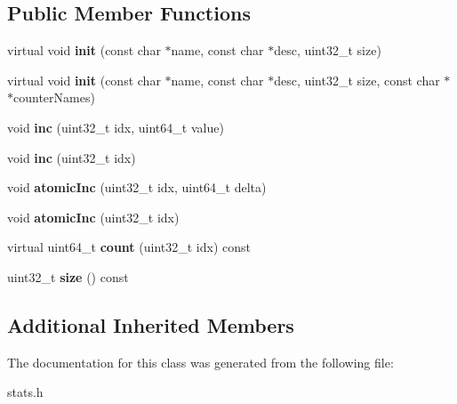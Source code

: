 \subsection*{Public Member Functions}
\begin{DoxyCompactItemize}
\item 
\hypertarget{classVectorCounter_a5124acc06cc12cdd7fcc8eb8cfe6739c}{virtual void {\bfseries init} (const char $\ast$name, const char $\ast$desc, uint32\-\_\-t size)}\label{classVectorCounter_a5124acc06cc12cdd7fcc8eb8cfe6739c}

\item 
\hypertarget{classVectorCounter_a24f4ecb5f982c44f9a3142b486afda46}{virtual void {\bfseries init} (const char $\ast$name, const char $\ast$desc, uint32\-\_\-t size, const char $\ast$$\ast$counter\-Names)}\label{classVectorCounter_a24f4ecb5f982c44f9a3142b486afda46}

\item 
\hypertarget{classVectorCounter_a803d078febd0aa1122b527f2ba418800}{void {\bfseries inc} (uint32\-\_\-t idx, uint64\-\_\-t value)}\label{classVectorCounter_a803d078febd0aa1122b527f2ba418800}

\item 
\hypertarget{classVectorCounter_a89da3b5154d4449bf7e591b420e6a437}{void {\bfseries inc} (uint32\-\_\-t idx)}\label{classVectorCounter_a89da3b5154d4449bf7e591b420e6a437}

\item 
\hypertarget{classVectorCounter_a4ec59076709f0e4f92da09684b430da6}{void {\bfseries atomic\-Inc} (uint32\-\_\-t idx, uint64\-\_\-t delta)}\label{classVectorCounter_a4ec59076709f0e4f92da09684b430da6}

\item 
\hypertarget{classVectorCounter_a5295f20e13bf83736c805cb0c0124cbf}{void {\bfseries atomic\-Inc} (uint32\-\_\-t idx)}\label{classVectorCounter_a5295f20e13bf83736c805cb0c0124cbf}

\item 
\hypertarget{classVectorCounter_a949669fe418060a4ac3a56dd78800b29}{virtual uint64\-\_\-t {\bfseries count} (uint32\-\_\-t idx) const }\label{classVectorCounter_a949669fe418060a4ac3a56dd78800b29}

\item 
\hypertarget{classVectorCounter_a95f7a0570dc7a6eafeb85cece275d069}{uint32\-\_\-t {\bfseries size} () const }\label{classVectorCounter_a95f7a0570dc7a6eafeb85cece275d069}

\end{DoxyCompactItemize}
\subsection*{Additional Inherited Members}


The documentation for this class was generated from the following file\-:\begin{DoxyCompactItemize}
\item 
stats.\-h\end{DoxyCompactItemize}
